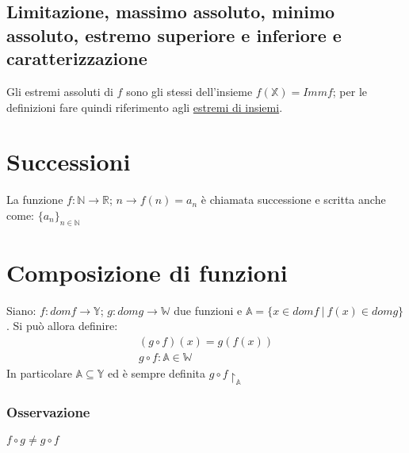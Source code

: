 \subsection{Limitazione, massimo assoluto, minimo assoluto, estremo superiore e inferiore e caratterizzazione}
Gli estremi assoluti di $f$ sono gli stessi dell'insieme $f(\mathbb{X}) = Immf$; per le definizioni fare quindi riferimento agli \hyperref[sec: estremiInsiemi]{\color{cyan}estremi di insiemi}.
\section{Successioni}
La funzione $f: \mathbb{N} \rightarrow \mathbb{R}$;  $n \rightarrow f(n) = a_n$ è chiamata successione e scritta anche come: $\{a_n\}_{n \in \mathbb{N}}$
\section{Composizione di funzioni}
Siano: $f: domf \rightarrow \mathbb{Y}$; $g: domg \rightarrow \mathbb{W}$ due funzioni e $\mathbb{A}=\{x \in domf\ |\ f(x) \in domg\}$. Si può allora definire:\\
\begin{equation}
\begin{gathered}
(g \circ f)(x) = g(f(x))\\
g \circ f: \mathbb{A} \in \mathbb{W}
\end{gathered}
\end{equation}
In particolare $\mathbb{A} \subseteq \mathbb{Y}$ ed è sempre definita $g \circ f \restriction _\mathbb{A}$
\subsubsection{Osservazione}
$f \circ g \neq g \circ f$
